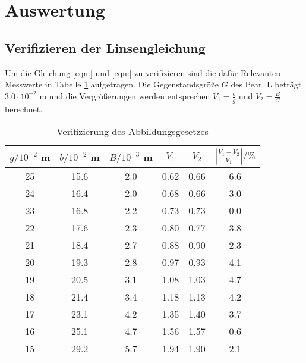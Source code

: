 \section{Auswertung}
\label{sec:Auswertung}
\subsection{Verifizieren der Linsengleichung}
Um die Gleichung \ref{eqn:} und \ref{eqn:} zu verifizieren sind die dafür Relevanten Messwerte in Tabelle \ref{tab:VdA} aufgetragen. Die Gegenstandsgröße $G$ des Pearl L beträgt $3.0 \cdot 10^{-2}$ m und die Vergrößerungen werden entsprechen $V_1 = \frac{b}{g}$ und $V_2 = \frac{B}{G}$ berechnet.
\begin{table}
  \centering
  \begin{tabular}{c c c c c c}
    \toprule
    $g / 10^{-2}$ m & $b / 10^{-2}$ m & $B / 10^{-3}$ m & $V_1$ & $V_2$ & $\left\lvert \frac{V_1 - V_2}{V_1} \right\rvert / \% $\\
   \midrule
    25	& 15.6	& 2.0 	& 0.62 & 0.66	& 6.6 	\\
    24	& 16.4	& 2.0	& 0.68 & 0.66	& 3.0	\\
    23	& 16.8	& 2.2	& 0.73 & 0.73	& 0.0	\\
    22	& 17.6	& 2.3	& 0.80 & 0.77	& 3.8	\\
    21	& 18.4	& 2.7	& 0.88 & 0.90	& 2.3	\\
    20	& 19.3	& 2.8	& 0.97 & 0.93	& 4.1	\\
    19	& 20.5	& 3.1	& 1.08 & 1.03	& 4.7	\\
    18	& 21.4	& 3.4	& 1.18 & 1.13	& 4.2	\\
    17	& 23.1	& 4.2	& 1.35 & 1.40	& 3.7	\\
    16	& 25.1	& 4.7	& 1.56 & 1.57	& 0.6	\\
    15	& 29.2	& 5.7	& 1.94 & 1.90	& 2.1	\\
    \bottomrule
  \end{tabular}
  \caption{Verifizierung des Abbildungsgesetzes}
  \label{tab:VdA}
\end{table}

